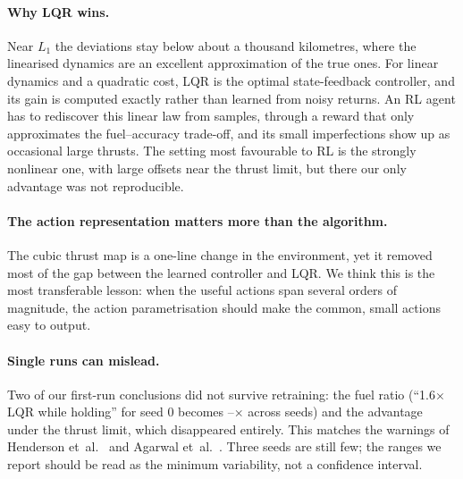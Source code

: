 \documentclass[11pt,a4paper]{article}
\begin{document}
\paragraph{Why LQR wins.}
Near $L_1$ the deviations stay below about a thousand kilometres, where the
linearised dynamics are an excellent approximation of the true ones. For
linear dynamics and a quadratic cost, LQR is the optimal state-feedback
controller, and its gain is computed exactly rather than learned from noisy
returns. An RL agent has to rediscover this linear law from samples, through a
reward that only approximates the fuel--accuracy trade-off, and its small
imperfections show up as occasional large thrusts. The setting most
favourable to RL is the strongly nonlinear one, with large offsets near the
thrust limit, but there our only advantage was not reproducible.

\paragraph{The action representation matters more than the algorithm.}
The cubic thrust map is a one-line change in the environment, yet it removed
most of the gap between the learned controller and LQR. We think this is the
most transferable lesson: when the useful actions span several orders of
magnitude, the action parametrisation should make the common, small actions
easy to output.

\paragraph{Single runs can mislead.}
Two of our first-run conclusions did not survive retraining: the fuel ratio
(``1.6$\times$ LQR while holding'' for seed 0 becomes
\cubRatioMin--\cubRatioMax$\times$ across seeds) and the advantage under the
thrust limit, which disappeared entirely. This matches the warnings of
Henderson et~al.\ \cite{henderson2018} and Agarwal et~al.\ \cite{agarwal2021}.
Three seeds are still few; the ranges we report should be read as the minimum
variability, not a confidence interval.
\end{document}
